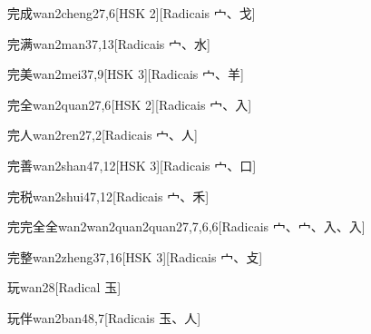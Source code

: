 \begin{entry}{完成}{wan2cheng2}{7,6}[HSK 2][Radicais ⼧、⼽]
\end{entry}

\begin{entry}{完满}{wan2man3}{7,13}[Radicais ⼧、⽔]
\end{entry}

\begin{entry}{完美}{wan2mei3}{7,9}[HSK 3][Radicais ⼧、⽺]
\end{entry}

\begin{entry}{完全}{wan2quan2}{7,6}[HSK 2][Radicais ⼧、⼊]
\end{entry}

\begin{entry}{完人}{wan2ren2}{7,2}[Radicais ⼧、⼈]
\end{entry}

\begin{entry}{完善}{wan2shan4}{7,12}[HSK 3][Radicais ⼧、⼝]
\end{entry}

\begin{entry}{完税}{wan2shui4}{7,12}[Radicais ⼧、⽲]
\end{entry}

\begin{entry}{完完全全}{wan2wan2quan2quan2}{7,7,6,6}[Radicais ⼧、⼧、⼊、⼊]
\end{entry}

\begin{entry}{完整}{wan2zheng3}{7,16}[HSK 3][Radicais ⼧、⽁]
\end{entry}

\begin{entry}{玩}{wan2}{8}[Radical ⽟]
\end{entry}

\begin{entry}{玩伴}{wan2ban4}{8,7}[Radicais ⽟、⼈]
\end{entry}

